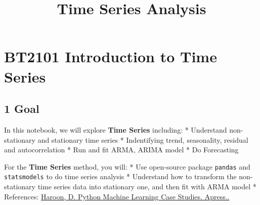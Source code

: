 \documentclass[11pt]{article}
\title{Time Series Analysis}
\begin{document}
    
    
    \maketitle
    
    

    
    \section{BT2101 Introduction to Time
Series}\label{bt2101-introduction-to-time-series}

    \subsection{1 Goal}\label{goal}

In this notebook, we will explore \textbf{Time Series} including: *
Understand non-stationary and stationary time series * Indentifying
trend, seasonality, residual and autocorrelation * Run and fit ARMA,
ARIMA model * Do Forecasting

For the \textbf{Time Series} method, you will: * Use open-source package
\texttt{pandas} and \texttt{statsmodels} to do time series analysis *
Understand how to transform the non-stationary time series data into
stationary one, and then fit with ARMA model * References:
\href{https://www.apress.com/gp/book/9781484228227}{Haroon, D. Python
Machine Learning Case Studies. Apress..}
\end{document}
